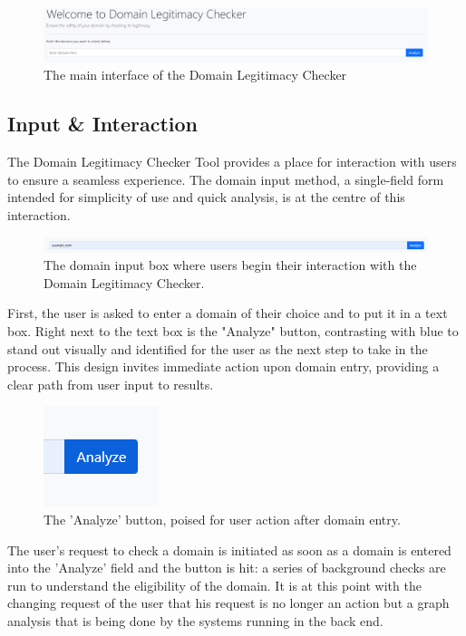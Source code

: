 \begin{figure}[H]
    \centering
    \includegraphics[width=1.1\linewidth]{project/image.png}
    \caption{The main interface of the Domain Legitimacy Checker}
    \label{fig:implem22}
\end{figure}

\subsection{Input \& Interaction}

 The Domain Legitimacy Checker Tool provides a place for interaction with users to ensure a seamless experience. The domain input method, a single-field form intended for simplicity of use and quick analysis, is at the centre of this interaction.
 
\begin{figure} [H]
    \centering
    \includegraphics[width=1.1\linewidth]{project/6.png}
    \caption{The domain input box where users begin their interaction with the Domain Legitimacy Checker.}
    \label{fig:impl2}
\end{figure}

First, the user is asked to enter a domain of their choice and to put it in a text box. Right next to the text box is the "Analyze" button, contrasting with blue to stand out visually and identified for the user as the next step to take in the process. This design invites immediate action upon domain entry, providing a clear path from user input to results.

\begin{figure}[H]
    \centering
    \includegraphics[width=0.1\linewidth]{project/8.png}
    \caption{The 'Analyze' button, poised for user action after domain entry.}
    \label{fig:imple2222}
\end{figure}

The user's request to check a domain is initiated as soon as a domain is entered into the 'Analyze' field and the button is hit: a series of background checks are run to understand the eligibility of the domain. It is at this point with the changing request of the user that his request is no longer an action but a graph analysis that is being done by the systems running in the back end.

